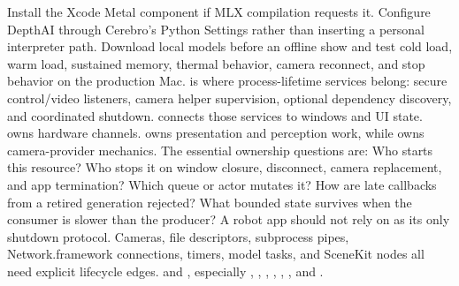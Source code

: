 {}\markdownRendererInterblockSeparator
{}Install the Xcode Metal component if MLX compilation requests it. Configure DepthAI through Cerebro's Python Settings rather than inserting a personal interpreter path. Download local models before an offline show and test cold load, warm load, sustained memory, thermal behavior, camera reconnect, and stop behavior on the production Mac.\markdownRendererInterblockSeparator
{}
\markdownRendererSectionEnd \markdownRendererSectionBegin
{}\markdownRendererInterblockSeparator
{} is where process-lifetime services belong: secure control/video listeners, camera helper supervision, optional dependency discovery, and coordinated shutdown.  connects those services to windows and UI state.  owns hardware channels.  owns presentation and perception work, while  owns camera-provider mechanics.\markdownRendererParagraphSeparator
{}The essential ownership questions are:\markdownRendererInterblockSeparator
{}\markdownRendererOlBegin
{}Who starts this resource?\markdownRendererOlItemEnd 
{}Who stops it on window closure, disconnect, camera replacement, and app termination?\markdownRendererOlItemEnd 
{}Which queue or actor mutates it?\markdownRendererOlItemEnd 
{}How are late callbacks from a retired generation rejected?\markdownRendererOlItemEnd 
{}What bounded state survives when the consumer is slower than the producer?\markdownRendererOlItemEnd 
\markdownRendererOlEnd \markdownRendererInterblockSeparator
{}A robot app should not rely on  as its only shutdown protocol. Cameras, file descriptors, subprocess pipes, Network.framework connections, timers, model tasks, and SceneKit nodes all need explicit lifecycle edges.\markdownRendererInterblockSeparator
{}
\markdownRendererSectionEnd \markdownRendererSectionBegin
{}\markdownRendererInterblockSeparator
{}\markdownRendererBlockQuoteBegin
{}  and , especially , , , , , , and .\markdownRendererBlockQuoteEnd \markdownRendererInterblockSeparator

